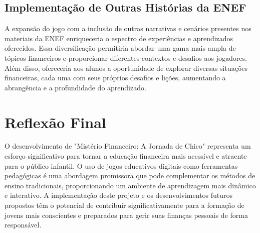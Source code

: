 \subsection{Implementação de Outras Histórias da ENEF}
A expansão do jogo com a inclusão de outras narrativas e cenários presentes nos materiais da ENEF enriqueceria o espectro de experiências e aprendizados oferecidos. Essa diversificação permitiria abordar uma gama mais ampla de tópicos financeiros e proporcionar diferentes contextos e desafios aos jogadores. Além disso, ofereceria aos alunos a oportunidade de explorar diversas situações financeiras, cada uma com seus próprios desafios e lições, aumentando a abrangência e a profundidade do aprendizado.

\section{Reflexão Final}
O desenvolvimento de "Mistério Financeiro: A Jornada de Chico" representa um esforço significativo para tornar a educação financeira mais acessível e atraente para o público infantil. O uso de jogos educativos digitais como ferramentas pedagógicas é uma abordagem promissora que pode complementar os métodos de ensino tradicionais, proporcionando um ambiente de aprendizagem mais dinâmico e interativo. A implementação deste projeto e os desenvolvimentos futuros propostos têm o potencial de contribuir significativamente para a formação de jovens mais conscientes e preparados para gerir suas finanças pessoais de forma responsável.